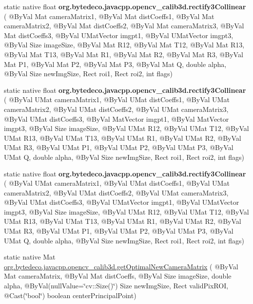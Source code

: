 \begin{DoxyCompactItemize}
\item 
\mbox{\label{group__calib3d_ga98a01b906ca3072ed6ae8a6f783b139a}} 
static native float {\bfseries org.\+bytedeco.\+javacpp.\+opencv\+\_\+calib3d.\+rectify3\+Collinear} ( @By\+Val Mat camera\+Matrix1, @By\+Val Mat dist\+Coeffs1, @By\+Val Mat camera\+Matrix2, @By\+Val Mat dist\+Coeffs2, @By\+Val Mat camera\+Matrix3, @By\+Val Mat dist\+Coeffs3, @By\+Val U\+Mat\+Vector imgpt1, @By\+Val U\+Mat\+Vector imgpt3, @By\+Val Size image\+Size, @By\+Val Mat R12, @By\+Val Mat T12, @By\+Val Mat R13, @By\+Val Mat T13, @By\+Val Mat R1, @By\+Val Mat R2, @By\+Val Mat R3, @By\+Val Mat P1, @By\+Val Mat P2, @By\+Val Mat P3, @By\+Val Mat Q, double alpha, @By\+Val Size new\+Img\+Size, Rect roi1, Rect roi2, int flags)
\item 
\mbox{\label{group__calib3d_ga176c1ca240ecc94d2720a882ebc15e5f}} 
static native float {\bfseries org.\+bytedeco.\+javacpp.\+opencv\+\_\+calib3d.\+rectify3\+Collinear} ( @By\+Val U\+Mat camera\+Matrix1, @By\+Val U\+Mat dist\+Coeffs1, @By\+Val U\+Mat camera\+Matrix2, @By\+Val U\+Mat dist\+Coeffs2, @By\+Val U\+Mat camera\+Matrix3, @By\+Val U\+Mat dist\+Coeffs3, @By\+Val Mat\+Vector imgpt1, @By\+Val Mat\+Vector imgpt3, @By\+Val Size image\+Size, @By\+Val U\+Mat R12, @By\+Val U\+Mat T12, @By\+Val U\+Mat R13, @By\+Val U\+Mat T13, @By\+Val U\+Mat R1, @By\+Val U\+Mat R2, @By\+Val U\+Mat R3, @By\+Val U\+Mat P1, @By\+Val U\+Mat P2, @By\+Val U\+Mat P3, @By\+Val U\+Mat Q, double alpha, @By\+Val Size new\+Img\+Size, Rect roi1, Rect roi2, int flags)
\item 
\mbox{\label{group__calib3d_ga7ce591d40d7287a87e7c7194ed192cd7}} 
static native float {\bfseries org.\+bytedeco.\+javacpp.\+opencv\+\_\+calib3d.\+rectify3\+Collinear} ( @By\+Val U\+Mat camera\+Matrix1, @By\+Val U\+Mat dist\+Coeffs1, @By\+Val U\+Mat camera\+Matrix2, @By\+Val U\+Mat dist\+Coeffs2, @By\+Val U\+Mat camera\+Matrix3, @By\+Val U\+Mat dist\+Coeffs3, @By\+Val U\+Mat\+Vector imgpt1, @By\+Val U\+Mat\+Vector imgpt3, @By\+Val Size image\+Size, @By\+Val U\+Mat R12, @By\+Val U\+Mat T12, @By\+Val U\+Mat R13, @By\+Val U\+Mat T13, @By\+Val U\+Mat R1, @By\+Val U\+Mat R2, @By\+Val U\+Mat R3, @By\+Val U\+Mat P1, @By\+Val U\+Mat P2, @By\+Val U\+Mat P3, @By\+Val U\+Mat Q, double alpha, @By\+Val Size new\+Img\+Size, Rect roi1, Rect roi2, int flags)
\item 
static native Mat \hyperlink{group__calib3d_ga70615047cb056a5e3787ce151ddef307}{org.\+bytedeco.\+javacpp.\+opencv\+\_\+calib3d.\+get\+Optimal\+New\+Camera\+Matrix} ( @By\+Val Mat camera\+Matrix, @By\+Val Mat dist\+Coeffs, @By\+Val Size image\+Size, double alpha, @By\+Val(null\+Value=\char`\"{}cv\+::\+Size()\char`\"{}) Size new\+Img\+Size, Rect valid\+Pix\+R\+OI, @Cast(\char`\"{}bool\char`\"{}) boolean center\+Principal\+Point)

\end{DoxyCompactItemize}
